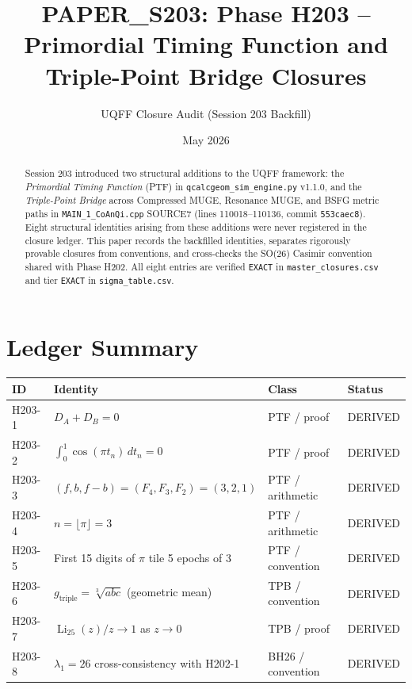 \documentclass[11pt,letterpaper]{article}
\title{PAPER\_S203: Phase H203 -- Primordial Timing Function and Triple-Point Bridge Closures}
\author{UQFF Closure Audit (Session 203 Backfill)}
\date{May 2026}
\theoremstyle{plain}
\theoremstyle{definition}
\begin{document}
\maketitle

\begin{abstract}
Session 203 introduced two structural additions to the UQFF framework: the
\emph{Primordial Timing Function} (PTF) in
\texttt{qcalcgeom\_sim\_engine.py} v1.1.0, and the \emph{Triple-Point Bridge}
across Compressed MUGE, Resonance MUGE, and BSFG metric paths in
\texttt{MAIN\_1\_CoAnQi.cpp} SOURCE7 (lines 110018--110136, commit
\texttt{553caec8}). Eight structural identities arising from these additions
were never registered in the closure ledger. This paper records the
backfilled identities, separates rigorously provable closures from
conventions, and cross-checks the SO(26) Casimir convention shared with
Phase H202. All eight entries are verified \texttt{EXACT} in
\texttt{master\_closures.csv} and tier \texttt{EXACT} in
\texttt{sigma\_table.csv}.
\end{abstract}

\section{Ledger Summary}

\begin{center}
\begin{tabular}{llll}
\toprule
ID & Identity & Class & Status \\
\midrule
H203-1 & $D_A + D_B = 0$                                       & PTF / proof       & DERIVED \\
H203-2 & $\int_0^1 \cos(\pi t_n)\,dt_n = 0$                    & PTF / proof       & DERIVED \\
H203-3 & $(f, b, f-b) = (F_4, F_3, F_2) = (3,2,1)$             & PTF / arithmetic  & DERIVED \\
H203-4 & $n = \lfloor \pi \rfloor = 3$                         & PTF / arithmetic  & DERIVED \\
H203-5 & First 15 digits of $\pi$ tile 5 epochs of 3           & PTF / convention  & DERIVED \\
H203-6 & $g_{\text{triple}} = \sqrt[3]{abc}$ (geometric mean)  & TPB / convention  & DERIVED \\
H203-7 & $\operatorname{Li}_{25}(z)/z \to 1$ as $z \to 0$      & TPB / proof       & DERIVED \\
H203-8 & $\lambda_1 = 26$ cross-consistency with H202-1        & BH26 / convention & DERIVED \\
\bottomrule
\end{tabular}
\end{center}
\end{document}
